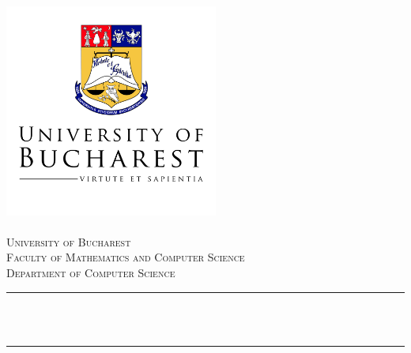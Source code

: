 \begin{titlepage}

\newcommand{\HRule}{\rule{\linewidth}{0.5mm}} %

\center %


\includegraphics[width=7cm]{content/fig/universitylogo.jpeg}\\[1cm] %
 

\quad\\
\textsc{\LARGE University of Bucharest}\\[1cm] %
\textsc{\Large Faculty of Mathematics and Computer Science}\\[0.5cm] %
\textsc{\large Department of Computer Science}\\[0.5cm] %

\makeatletter
\HRule \\[0.4cm]
{ \huge \bfseries \@title}\\[0.4cm] %
\HRule \\[1.5cm]
 

\end{titlepage}
